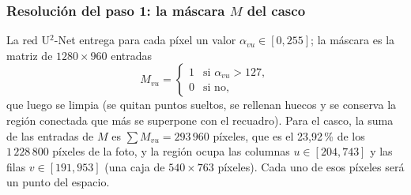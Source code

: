 \subsubsection{Resolución del paso 1: la máscara $M$ del casco}\label{sec:casco-mascara}

La red U$^2$-Net entrega para cada píxel un valor $\alpha_{vu}\in[0,255]$; la máscara es la matriz de $1280\times960$ entradas
\begin{equation}
M_{vu}=\begin{cases}1&\text{si }\alpha_{vu}>127,\\0&\text{si no,}\end{cases}
\end{equation}
que luego se limpia (se quitan puntos sueltos, se rellenan huecos y se conserva la región conectada que más se
superpone con el recuadro). Para el casco, la suma de las entradas de $M$ es
$\sum M_{vu}=293\,960$ píxeles, que es el 23{,}92\,\% de los $1\,228\,800$ píxeles de la foto, y la región ocupa las columnas
$u\in[204,743]$ y las filas $v\in[191,953]$ (una caja de $540\times763$ píxeles). Cada uno de esos píxeles
será un punto del espacio.
